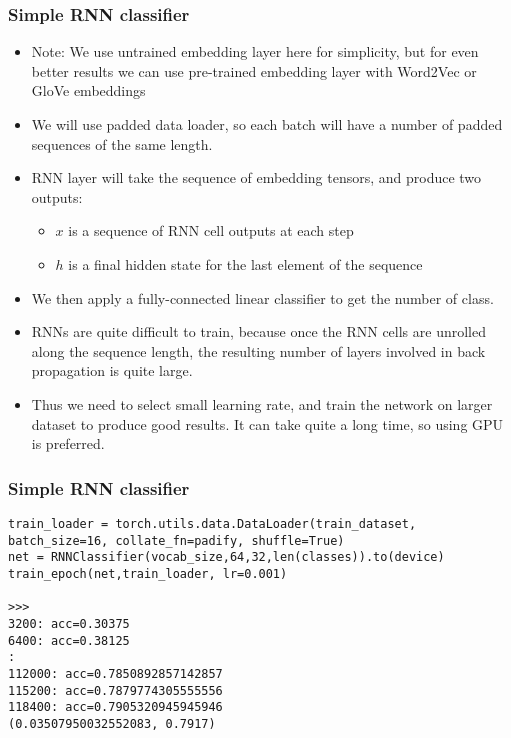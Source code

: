\begin{frame}[fragile] \frametitle{Simple RNN classifier}


\begin{itemize}
\item Note: We use untrained embedding layer here for simplicity, but for even better results we can use pre-trained embedding layer with Word2Vec or GloVe embeddings
\item  We will use padded data loader, so each batch will have a number of padded sequences of the same length. 
\item RNN layer will take the sequence of embedding tensors, and produce two outputs:
\begin{itemize}
\item  $x$  is a sequence of RNN cell outputs at each step
\item $h$ is a final hidden state for the last element of the sequence
\end{itemize}
\item We then apply a fully-connected linear classifier to get the number of class.
\item RNNs are quite difficult to train, because once the RNN cells are unrolled along the sequence length, the resulting number of layers involved in back propagation is quite large.
\item Thus we need to select small learning rate, and train the network on larger dataset to produce good results. It can take quite a long time, so using GPU is preferred.
\end{itemize}


\end{frame}

\begin{frame}[fragile] \frametitle{Simple RNN classifier}

\begin{lstlisting}
train_loader = torch.utils.data.DataLoader(train_dataset, batch_size=16, collate_fn=padify, shuffle=True)
net = RNNClassifier(vocab_size,64,32,len(classes)).to(device)
train_epoch(net,train_loader, lr=0.001)

>>>
3200: acc=0.30375
6400: acc=0.38125
:
112000: acc=0.7850892857142857
115200: acc=0.7879774305555556
118400: acc=0.7905320945945946
(0.03507950032552083, 0.7917)
\end{lstlisting}


\end{frame}

